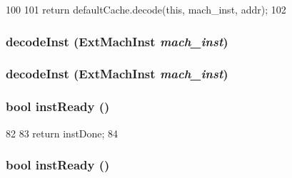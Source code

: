 \begin{DoxyCode}
100     {
101         return defaultCache.decode(this, mach_inst, addr);
102     }
\end{DoxyCode}
\hypertarget{classMipsISA_1_1Decoder_a148768e0e9062eb41f604040d0ea86e6}{
\subsubsection[{decodeInst}]{ decodeInst ({\bf ExtMachInst} {\em mach\_\-inst})}}
\label{classMipsISA_1_1Decoder_a148768e0e9062eb41f604040d0ea86e6}
\hypertarget{classMipsISA_1_1Decoder_a148768e0e9062eb41f604040d0ea86e6}{
\subsubsection[{decodeInst}]{ decodeInst ({\bf ExtMachInst} {\em mach\_\-inst})}}
\label{classMipsISA_1_1Decoder_a148768e0e9062eb41f604040d0ea86e6}
\hypertarget{classMipsISA_1_1Decoder_a9f6a0bc8946ca58d5d59a5dbc6a3181f}{
\subsubsection[{instReady}]{\setlength{\rightskip}{0pt plus 5cm}bool instReady ()}}
\label{classMipsISA_1_1Decoder_a9f6a0bc8946ca58d5d59a5dbc6a3181f}



\begin{DoxyCode}
82     {
83         return instDone;
84     }
\end{DoxyCode}
\hypertarget{classMipsISA_1_1Decoder_a9f6a0bc8946ca58d5d59a5dbc6a3181f}{
\subsubsection[{instReady}]{\setlength{\rightskip}{0pt plus 5cm}bool instReady ()}}
\label{classMipsISA_1_1Decoder_a9f6a0bc8946ca58d5d59a5dbc6a3181f}



